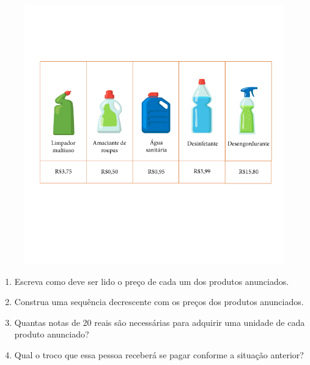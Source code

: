 \begin{figure}[htpb!]
\includegraphics[width=\textwidth]{../ilustracoes/MAT5/SAEB_5ANO_MAT_figura55.png}
\end{figure}

\begin{enumerate}
\item
  Escreva como deve ser lido o preço de cada um dos produtos anunciados.


\item
  Construa uma sequência decrescente com os preços dos produtos anunciados.


\item
  Quantas notas de 20 reais são necessárias para adquirir uma unidade de
  cada produto anunciado?


\item
  Qual o troco que essa pessoa receberá se pagar conforme a situação anterior?

\end{enumerate}



